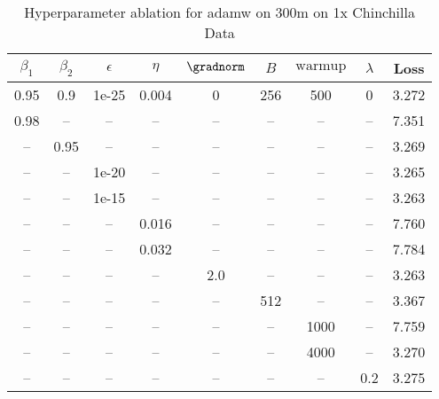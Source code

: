 \begin{table}[h!]
\centering
\caption{Hyperparameter ablation for adamw on 300m on 1x Chinchilla Data}
\label{tab:ablation_adamw_300m_on_1x_chinchilla_data}
\begin{tabular}{ccccccccc}
\toprule
$\beta_1$ & $\beta_2$ & $\epsilon$ & $\eta$ & $\gradnorm$ & $B$ & $\mathrm{warmup}$ & $\lambda$ & Loss \\
\midrule
0.95 & 0.9 & 1e-25 & 0.004 & 0 & 256 & 500 & 0 & 3.272 \\
\midrule
0.98 & -- & -- & -- & -- & -- & -- & -- & 7.351 \\
-- & 0.95 & -- & -- & -- & -- & -- & -- & 3.269 \\
-- & -- & 1e-20 & -- & -- & -- & -- & -- & 3.265 \\
-- & -- & 1e-15 & -- & -- & -- & -- & -- & 3.263 \\
-- & -- & -- & 0.016 & -- & -- & -- & -- & 7.760 \\
-- & -- & -- & 0.032 & -- & -- & -- & -- & 7.784 \\
-- & -- & -- & -- & 2.0 & -- & -- & -- & 3.263 \\
-- & -- & -- & -- & -- & 512 & -- & -- & 3.367 \\
-- & -- & -- & -- & -- & -- & 1000 & -- & 7.759 \\
-- & -- & -- & -- & -- & -- & 4000 & -- & 3.270 \\
-- & -- & -- & -- & -- & -- & -- & 0.2 & 3.275 \\
\bottomrule
\end{tabular}
\end{table}

